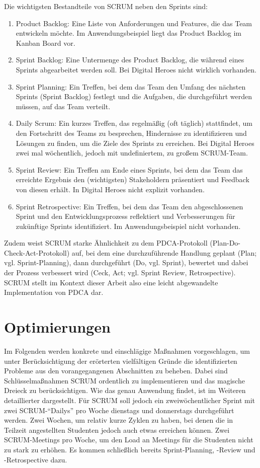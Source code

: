 Die wichtigsten Bestandteile von SCRUM neben den Sprints sind:
\begin{enumerate}
\item Product Backlog: Eine Liste von Anforderungen und Features, die das Team entwickeln möchte. 
Im Anwendungsbeispiel liegt das Product Backlog im Kanban Board vor. 
\item Sprint Backlog: Eine Untermenge des Product Backlog, die während eines Sprints abgearbeitet werden soll.
Bei Digital Heroes nicht wirklich vorhanden.
\item Sprint Planning: Ein Treffen, bei dem das Team den Umfang des nächsten Sprints (Sprint Backlog) festlegt
und die Aufgaben, die durchgeführt werden müssen, auf das Team verteilt.
\item Daily Scrum: Ein kurzes Treffen, das regelmäßig (oft täglich) stattfindet, 
um den Fortschritt des Teams zu besprechen, 
Hindernisse zu identifizieren und Lösungen zu finden, um die Ziele des Sprints zu erreichen.
Bei Digital Heroes zwei mal wöchentlich, jedoch mit undefiniertem, zu großem SCRUM-Team. 
\item Sprint Review: Ein Treffen am Ende eines Sprints,
bei dem das Team das erreichte Ergebnis den (wichtigsten) Stakeholdern präsentiert 
und Feedback von diesen erhält. In Digital Heroes nicht explizit vorhanden. 
\item Sprint Retrospective: Ein Treffen, bei dem das Team den abgeschlossenen Sprint 
und den Entwicklungsprozess reflektiert und Verbesserungen für zukünftige Sprints identifiziert.
Im Anwendungsbeispiel nicht vorhanden.
\end{enumerate}

Zudem weist SCRUM starke Ähnlichkeit zu dem PDCA-Protokoll (Plan-Do-Check-Act-Protokoll) auf, 
bei dem eine durchzuführende Handlung geplant (Plan; vgl. Sprint-Planning), 
dann durchgeführt (Do, vgl. Sprint), bewertet und dabei der Prozess verbessert wird 
(Ceck, Act; vgl. Sprint Review, Retrospective). SCRUM stellt im Kontext dieser Arbeit also eine 
leicht abgewandelte Implementation von PDCA dar. 


\section{Optimierungen}

Im Folgenden werden konkrete und einschlägige Maßnahmen vorgeschlagen, um unter Berücksichtigung 
der erörterten vielfältigen Gründe die identifizierten Probleme aus den vorangegangenen Abschnitten 
zu beheben. Dabei sind Schlüsselmaßnahmen SCRUM ordentlich zu implementieren 
und das magische Dreieck zu berücksichtigen. Wie das genau Anwendung findet, ist im Weiteren 
detaillierter dargestellt. Für SCRUM soll jedoch ein zweiwöchentlicher Sprint mit zwei SCRUM-\enquote{Dailys} 
pro Woche dienstags und donnerstags durchgeführt werden. Zwei Wochen, um relativ kurze Zyklen zu haben, 
bei denen die in Teilzeit angestellten Studenten jedoch auch etwas erreichen können. 
Zwei SCRUM-Meetings pro Woche, um den Load an Meetings für die Studenten nicht zu stark zu erhöhen. 
Es kommen schließlich bereits Sprint-Planning, -Review und -Retrospective dazu. 

